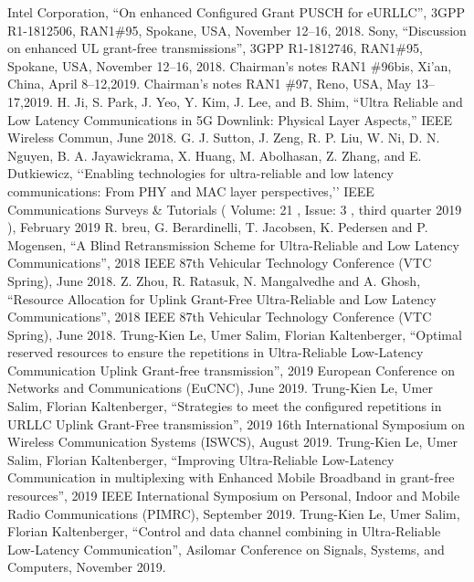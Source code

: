 \documentclass{report}
\begin{document}
\begin{thebibliography}{9}
 Intel Corporation, ``On enhanced Configured Grant PUSCH for eURLLC'', 3GPP R1-1812506, RAN1\#95, Spokane, USA, November 12--16, 2018.
 Sony, ``Discussion on enhanced UL grant-free transmissions'', 3GPP R1-1812746, RAN1\#95, Spokane, USA, November 12--16, 2018.
 Chairman's notes RAN1 \#96bis, Xi'an, China, April 8--12,2019.
 Chairman's notes RAN1 \#97, Reno, USA, May 13--17,2019.
 H.  Ji,  S.  Park,  J.  Yeo,  Y.  Kim,  J.  Lee,  and  B.  Shim,  “Ultra  Reliable and  Low  Latency  Communications  in  5G  Downlink:  Physical  Layer Aspects,” IEEE Wireless Commun, June 2018.
 G. J. Sutton, J. Zeng, R. P. Liu, W. Ni, D. N. Nguyen, B. A. Jayawickrama, X. Huang, M. Abolhasan, Z. Zhang, and E. Dutkiewicz, ‘‘Enabling technologies for ultra-reliable and low latency communications: From PHY and MAC layer perspectives,’’ IEEE Communications Surveys \& Tutorials ( Volume: 21 , Issue: 3 , third quarter 2019 ), February 2019
 R. breu, G. Berardinelli, T. Jacobsen, K. Pedersen and P. Mogensen, ``A Blind Retransmission Scheme for Ultra-Reliable and Low Latency Communications'', 2018 IEEE 87th Vehicular Technology Conference (VTC Spring), June 2018.
 Z. Zhou, R. Ratasuk, N. Mangalvedhe and A. Ghosh, ``Resource Allocation for Uplink Grant-Free Ultra-Reliable and Low Latency Communications'', 2018 IEEE 87th Vehicular Technology Conference (VTC Spring), June 2018.
 Trung-Kien Le, Umer Salim, Florian Kaltenberger, ``Optimal reserved resources to ensure the repetitions in Ultra-Reliable Low-Latency Communication Uplink Grant-free transmission'',  2019 European Conference on Networks and Communications (EuCNC), June 2019.
 Trung-Kien Le, Umer Salim, Florian Kaltenberger, ``Strategies to meet the configured repetitions in URLLC Uplink Grant-Free transmission'',  2019 16th International Symposium on Wireless Communication Systems (ISWCS), August 2019.
 Trung-Kien Le, Umer Salim, Florian Kaltenberger, ``Improving Ultra-Reliable Low-Latency Communication in multiplexing with Enhanced Mobile Broadband in grant-free resources'', 2019 IEEE International Symposium on Personal, Indoor and Mobile Radio Communications (PIMRC), September 2019.
 Trung-Kien Le, Umer Salim, Florian Kaltenberger, ``Control and data channel combining in Ultra-Reliable Low-Latency Communication'', Asilomar Conference on Signals, Systems, and Computers, November 2019.
\end{thebibliography}
\clearpage
\end{document}
